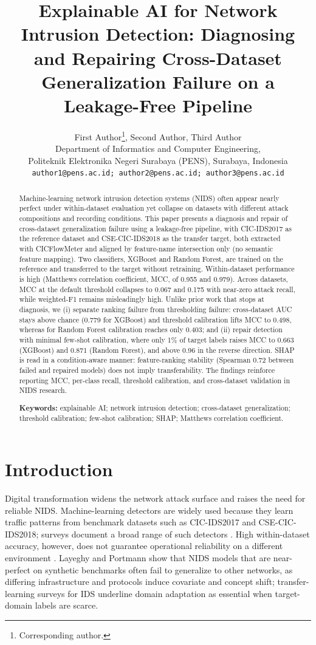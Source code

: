 \documentclass[11pt,a4paper]{article}
\title{\textbf{Explainable AI for Network Intrusion Detection:
Diagnosing and Repairing Cross-Dataset Generalization Failure
on a Leakage-Free Pipeline}}
\author{First Author\thanks{Corresponding author.},
\quad Second Author, \quad Third Author \\[0.3em]
\normalsize Department of Informatics and Computer Engineering, \\
\normalsize Politeknik Elektronika Negeri Surabaya (PENS), Surabaya, Indonesia \\
\normalsize \texttt{author1@pens.ac.id; author2@pens.ac.id; author3@pens.ac.id}}
\date{}
\begin{document}
\maketitle

\begin{abstract}
\noindent Machine-learning network intrusion detection systems (NIDS) often appear nearly
perfect under within-dataset evaluation yet collapse on datasets with different attack
compositions and recording conditions. This paper presents a diagnosis and repair of
cross-dataset generalization failure using a leakage-free pipeline, with CIC-IDS2017 as the
reference dataset and CSE-CIC-IDS2018 as the transfer target, both extracted with
CICFlowMeter and aligned by feature-name intersection only (no semantic feature mapping).
Two classifiers, XGBoost and Random Forest, are trained on the reference and transferred to
the target without retraining. Within-dataset performance is high (Matthews correlation
coefficient, MCC, of 0.955 and 0.979). Across datasets, MCC at the default threshold
collapses to 0.067 and 0.175 with near-zero attack recall, while weighted-F1 remains
misleadingly high. Unlike prior work that stops at diagnosis, we (i) separate ranking
failure from thresholding failure: cross-dataset AUC stays above chance (0.779 for XGBoost)
and threshold calibration lifts MCC to 0.498, whereas for Random Forest calibration reaches
only 0.403; and (ii) repair detection with minimal few-shot calibration, where only 1\% of
target labels raises MCC to 0.663 (XGBoost) and 0.871 (Random Forest), and above 0.96 in
the reverse direction. SHAP is read in a condition-aware manner: feature-ranking stability
(Spearman 0.72 between failed and repaired models) does not imply transferability. The
findings reinforce reporting MCC, per-class recall, threshold calibration, and cross-dataset
validation in NIDS research.

\medskip
\noindent\textbf{Keywords:} explainable AI; network intrusion detection; cross-dataset
generalization; threshold calibration; few-shot calibration; SHAP; Matthews correlation
coefficient.
\end{abstract}

\section{Introduction}
Digital transformation widens the network attack surface and raises the need for reliable
NIDS. Machine-learning detectors are widely used because they learn traffic patterns from
benchmark datasets such as CIC-IDS2017 \cite{sharafaldin} and CSE-CIC-IDS2018; surveys
document a broad range of such detectors \cite{buczak,shone,wu}. High within-dataset accuracy,
however, does not guarantee operational reliability on a different environment
\cite{dhooge,cantone}. Layeghy and Portmann \cite{layeghygen} show that NIDS models that
are near-perfect on synthetic benchmarks often fail to generalize to other networks, as
differing infrastructure and protocols induce covariate and concept shift; transfer-learning
surveys for IDS \cite{kheddar} underline domain adaptation as essential when target-domain
labels are scarce.
\end{document}
